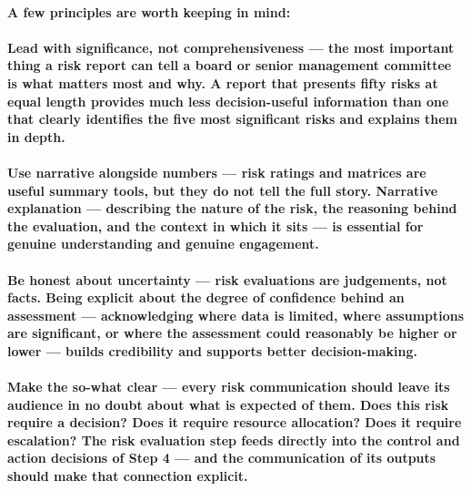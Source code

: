 \paragraph{A few principles are worth keeping in mind:}
\paragraph{\textbf{Lead with significance, not comprehensiveness} — the most important thing a risk report can tell a board or senior management committee is what matters most and why. A report that presents fifty risks at equal length provides much less decision-useful information than one that clearly identifies the five most significant risks and explains them in depth.}
\paragraph{\textbf{Use narrative alongside numbers} — risk ratings and matrices are useful summary tools, but they do not tell the full story. Narrative explanation — describing the nature of the risk, the reasoning behind the evaluation, and the context in which it sits — is essential for genuine understanding and genuine engagement.}
\paragraph{\textbf{Be honest about uncertainty} — risk evaluations are judgements, not facts. Being explicit about the degree of confidence behind an assessment — acknowledging where data is limited, where assumptions are significant, or where the assessment could reasonably be higher or lower — builds credibility and supports better decision-making.}
\paragraph{\textbf{Make the so-what clear} — every risk communication should leave its audience in no doubt about what is expected of them. Does this risk require a decision? Does it require resource allocation? Does it require escalation? The risk evaluation step feeds directly into the control and action decisions of Step 4 — and the communication of its outputs should make that connection explicit.}

\newpage
